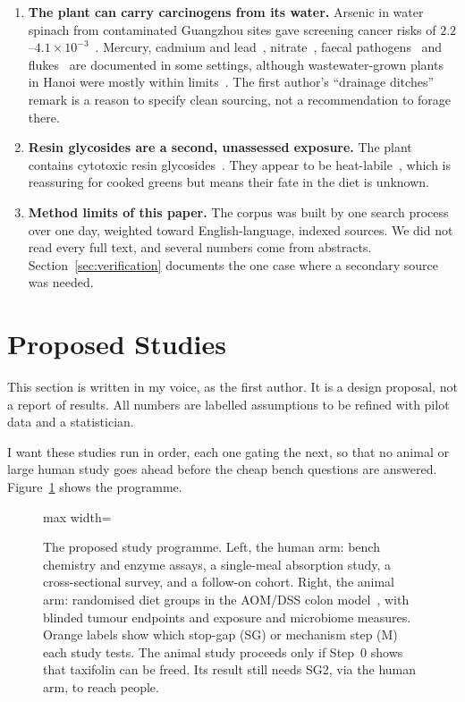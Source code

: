 \documentclass[11pt,a4paper]{article}
\begin{document}
\begin{enumerate}[label=\textbf{C\arabic*.}, leftmargin=2.4em]
\item \textbf{The plant can carry carcinogens from its water.} Arsenic in water spinach from contaminated Guangzhou sites gave screening cancer risks of $2.2$--$4.1\times10^{-3}$~\cite{wu2026}. Mercury, cadmium and lead~\cite{gothberg2002}, nitrate~\cite{thang2021}, faecal pathogens~\cite{vuong2007} and flukes~\cite{graczyk2001} are documented in some settings, although wastewater-grown plants in Hanoi were mostly within limits~\cite{marcussen2008}. The first author's ``drainage ditches'' remark is a reason to specify clean sourcing, not a recommendation to forage there.
\item \textbf{Resin glycosides are a second, unassessed exposure.} The plant contains cytotoxic resin glycosides~\cite{fan2014,sasikala2022}. They appear to be heat-labile~\cite{toy2022}, which is reassuring for cooked greens but means their fate in the diet is unknown.
\item \textbf{Method limits of this paper.} The corpus was built by one search process over one day, weighted toward English-language, indexed sources. We did not read every full text, and several numbers come from abstracts. Section~\ref{sec:verification} documents the one case where a secondary source was needed.
\end{enumerate}

\section{Proposed Studies}
\label{sec:studies}

\begin{voicebox}
This section is written in my voice, as the first author. It is a design proposal, not a report of results. All numbers are labelled assumptions to be refined with pilot data and a statistician.
\end{voicebox}

I want these studies run in order, each one gating the next, so that no animal or large human study goes ahead before the cheap bench questions are answered. Figure~\ref{fig:studies} shows the programme.

\begin{figure}[H]
\centering
\begin{adjustbox}{max width=\linewidth}\end{adjustbox}
\caption{The proposed study programme. Left, the human arm: bench chemistry and enzyme assays, a single-meal absorption study, a cross-sectional survey, and a follow-on cohort. Right, the animal arm: randomised diet groups in the AOM/DSS colon model~\cite{neufert2007}, with blinded tumour endpoints and exposure and microbiome measures. Orange labels show which stop-gap (SG) or mechanism step (M) each study tests. The animal study proceeds only if Step~0 shows that taxifolin can be freed. Its result still needs SG2, via the human arm, to reach people.}
\label{fig:studies}
\end{figure}
\end{document}
